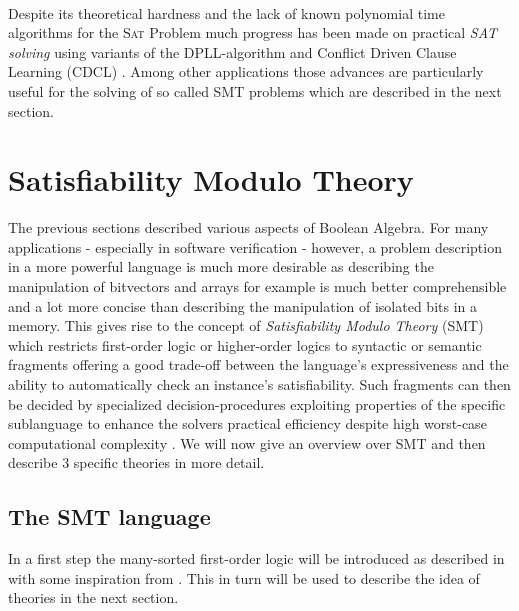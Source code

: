 \paragraph{}
Despite its theoretical hardness and the lack of known polynomial time algorithms for the \textsc{Sat} Problem much progress has been made on practical \textit{SAT solving} using variants of the DPLL-algorithm and Conflict Driven Clause Learning (CDCL) \cite{Marques-Silva-PropositionalSATSolving}.
Among other applications those advances are particularly useful for the solving of so called SMT problems which are described in the next section.


\section{Satisfiability Modulo Theory}
The previous sections described various aspects of Boolean Algebra. For many applications - especially in software verification - however, a problem description in a more powerful language is much more desirable as describing the manipulation of bitvectors and arrays for example is much better comprehensible and a lot more concise than describing the manipulation of isolated bits in a memory. This gives rise to the concept of \textit{Satisfiability Modulo Theory} (SMT) which restricts first-order logic or higher-order logics to syntactic or semantic fragments offering a good trade-off between the language's expressiveness and the ability to automatically check an instance's satisfiability. Such fragments can then be decided by specialized decision-procedures exploiting properties of the specific sublanguage to enhance the solvers practical efficiency despite high worst-case computational complexity \cite{Barrett-Tinelli-SMT}. We will now give an overview over SMT and then describe 3 specific theories in more detail.

\subsection{The SMT language}
In a first step the many-sorted first-order logic will be introduced as described in \cite{Barrett-Tinelli-SMT} with some inspiration from \cite{fondements-logique}. This in turn will be used to describe the idea of theories in the next section.

